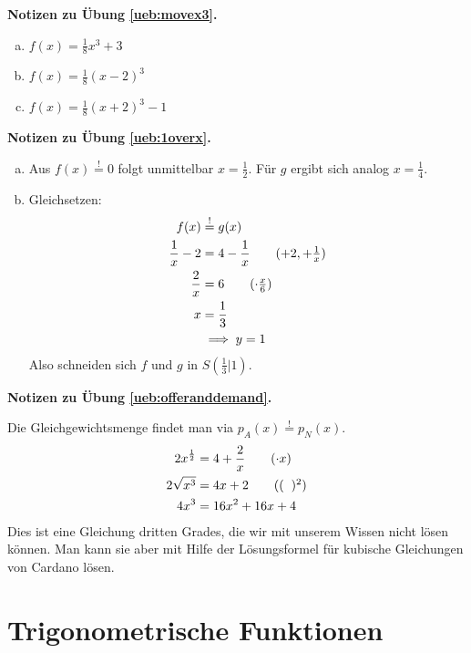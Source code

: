 \documentclass[%
11pt,%
twoside,%
titlepage,%
german,%
headsepline%
]{scrartcl}
\newcommand{\concatueb}[1]{ueb:#1}%
\newcommand{\concatlsg}[1]{lsg:#1}%
\newenvironment{lsg}[1]{%
    \par\noindent\textbf{Notizen zu Übung \ref{\concatueb{#1}}.}%
    \label{\concatlsg{#1}}
}{%
    \par%
}
\begin{document}
\begin{lsg}{movex3}
  \begin{enumerate}[a)]
    \item $f(x)=\frac{1}{8}x^3+3$
    \item $f(x)=\frac{1}{8}(x-2)^3$
    \item $f(x)=\frac{1}{8}(x+2)^3-1$
  \end{enumerate}
\end{lsg}

\begin{lsg}{1overx}
  \begin{enumerate}[a)]
    \item Aus $f(x)\stackrel{!}{=}0$ folgt unmittelbar $x=\frac{1}{2}$. Für $g$ ergibt sich analog $x=\frac{1}{4}$.
    \item Gleichsetzen:
    \begin{align*}
      f(x)&\stackrel{!}{=} g(x)\\
      \frac{1}{x}-2 &= 4-\frac{1}{x}\tag{$+2,+\frac{1}{x}$}\\
      \frac{2}{x} &= 6\tag{$\cdot\frac{x}{6}$}\\
      x &= \frac{1}{3}\\
      &\implies y=1
    \end{align*}
    Also schneiden sich $f$ und $g$ in $S(\frac{1}{3}|1)$.
  \end{enumerate}
\end{lsg}

\begin{lsg}{offeranddemand}
  Die Gleichgewichtsmenge findet man via $p_A(x)\stackrel{!}{=} p_N(x)$.
    \begin{align*}
      2x^\frac{1}{2} &= 4+\frac{2}{x}\tag{$\cdot x$}\\
      2\sqrt{x^3} &= 4x + 2\tag{$(\phantom{x})^2$}\\
      4x^3 &= 16x^2 +16x + 4
    \end{align*}
  Dies ist eine Gleichung dritten Grades, die wir mit unserem Wissen nicht lösen können. Man kann sie aber mit Hilfe der Lösungsformel für kubische Gleichungen von Cardano lösen.
\end{lsg}

\clearpage

\section{Trigonometrische Funktionen}
\end{document}
